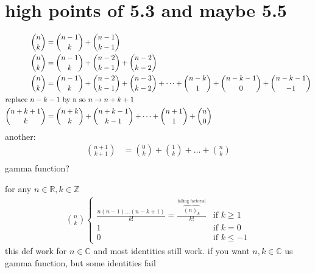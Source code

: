 \documentclass{article}
\begin{document}
\section*{high points of 5.3 and maybe 5.5}
\begin{align*}
  \binom{n}{k}&=\binom{n-1}{k}+\binom{n-1}{k-1}\\
  \binom{n}{k}&=\binom{n-1}{k}+\binom{n-2}{k-1}+\binom{n-2}{k-2}\\
  \binom{n}{k}&=\binom{n-1}{k}+\binom{n-2}{k-1}+\binom{n-3}{k-2}+\dots+\binom{n-k}{1}+\binom{n-k-1}{0}+\binom{n-k-1}{-1}\\
\intertext{replace $n-k-1$ by n so $n\to n+k+1$}
  \binom{n+k+1}{k}&=\binom{n+k}{k}+\binom{n+k-1}{k-1}+\dots+\binom{n+1}{1}+\binom{n}{0}\\
\end{align*}
another:
\begin{align*}
  \binom{n+1}{k+1}&=\binom{0}{k}+\binom{1}{k}+\dots+\binom{n}{k}\\
\end{align*}
gamma function?

for any $n\in\mathbb{R},k\in\mathbb{Z}$
\begin{align*}
  \binom{n}{k}
  \begin{cases}
    \frac{n(n-1)\dots(n-k+1)}{k!}=\frac{\overbrace{(n)_k}^{\text{falling factorial}}}{k!}&\text{if }k\ge1\\
    1&\text{if }k=0\\
    0&\text{if }k\le-1
  \end{cases}
\end{align*}
this def work for $n\in\mathbb{C}$ and most identities still work. if you want $n,k\in\mathbb{C}$ us gamma function, but some identities fail
\end{document}
